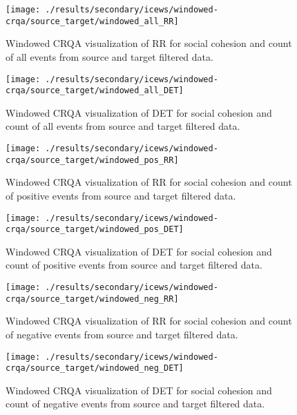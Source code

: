 \documentclass[english,man]{apa6}
\begin{document}
\begin{figure}
\texttt{[image: ./results/secondary/icews/windowed-crqa/source\_target/windowed\_all\_RR]} \caption{Windowed CRQA visualization of RR for social cohesion and count of all events from source and target filtered data.}\label{fig:plot-RR-source-targ-all-secondary-icews}
\end{figure}

\begin{figure}
\texttt{[image: ./results/secondary/icews/windowed-crqa/source\_target/windowed\_all\_DET]} \caption{Windowed CRQA visualization of DET for social cohesion and count of all events from source and target filtered data.}\label{fig:plot-DET-source-targ-all-secondary-icews}
\end{figure}

\begin{figure}
\texttt{[image: ./results/secondary/icews/windowed-crqa/source\_target/windowed\_pos\_RR]} \caption{Windowed CRQA visualization of RR for social cohesion and count of positive events from source and target filtered data.}\label{fig:plot-RR-source-targ-pos-secondary-icews}
\end{figure}

\begin{figure}
\texttt{[image: ./results/secondary/icews/windowed-crqa/source\_target/windowed\_pos\_DET]} \caption{Windowed CRQA visualization of DET for social cohesion and count of positive events from source and target filtered data.}\label{fig:plot-DET-source-targ-pos-secondary-icews}
\end{figure}

\begin{figure}
\texttt{[image: ./results/secondary/icews/windowed-crqa/source\_target/windowed\_neg\_RR]} \caption{Windowed CRQA visualization of RR for social cohesion and count of negative events from source and target filtered data.}\label{fig:plot-RR-source-targ-neg-secondary-icews}
\end{figure}

\begin{figure}
\texttt{[image: ./results/secondary/icews/windowed-crqa/source\_target/windowed\_neg\_DET]} \caption{Windowed CRQA visualization of DET for social cohesion and count of negative events from source and target filtered data.}\label{fig:plot-DET-source-targ-neg-secondary-icews}
\end{figure}
\end{document}
